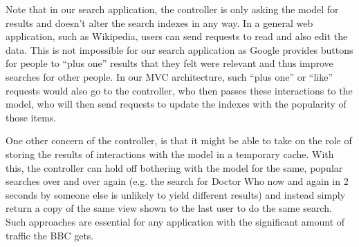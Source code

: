 \documentclass{beamer}
\begin{document}
{  Note that in our search application, the controller is only asking the model
  for results and doesn't alter the search indexes in any way. In a general
  web application, such as Wikipedia, users can send requests to read and also
  edit the data. This is not impossible for our search application as Google
  provides buttons for people to ``plus one'' results that they felt were
  relevant and thus improve searches for other people. In our MVC architecture,
  such ``plus one'' or ``like'' requests would also go to the controller, who
  then passes these interactions to the model, who will then send requests
  to update the indexes with the popularity of those items.

  One other concern of the controller, is that it might be able to take on
  the role of storing the results of interactions with the model in a
  temporary cache. With this, the controller can hold off bothering with the
  model for the same, popular searches over and over again (e.g. the search
  for Doctor Who now and again in 2 seconds by someone else is unlikely to
  yield different results) and instead simply return a copy of the same view
  shown to the last user to do the same search. Such approaches are essential
  for any application with the significant amount of traffic the BBC gets.
}
\end{document}
